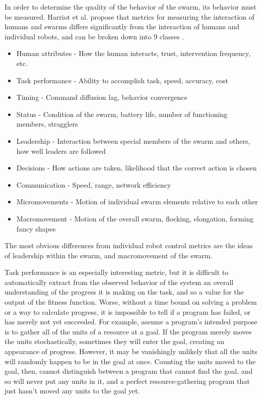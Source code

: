 \documentclass[]{article}
\begin{document}
In order to determine the quality of the behavior of the swarm, its behavior must be measured.
Harriot et al. propose that metrics for measuring the interaction of humans and swarms differs significantly from the interaction of humans and individual robots, and can be broken down into 9 classes \cite{harriott2014biologically}. 
\begin{itemize}
\item Human attributes - How the human interacts, trust, intervention frequency, etc. 
\item Task performance - Ability to accomplish task, speed, accuracy, cost
\item Timing - Command diffusion lag, behavior convergence
\item Status - Condition of the swarm, battery life, number of functioning members, stragglers
\item Leadership - Interaction between special members of the swarm and others, how well leaders are followed
\item Decisions - How actions are taken, likelihood that the correct action is chosen
\item Communication - Speed, range, network efficiency
\item Micromovements - Motion of individual swarm elements relative to each other
\item Macromovement - Motion of the overall swarm, flocking, elongation, forming fancy shapes 
\end{itemize}
The most obvious differences from individual robot control metrics are the ideas of leadership within the swarm, and macromovement of the swarm.

Task performance is an especially interesting metric, but it is difficult to automatically extract from the observed behavior of the system an overall understanding of the progress it is making on the task, and so a value for the output of the fitness function. 
Worse, without a time bound on solving a problem or a way to calculate progress, it is impossible to tell if a program has failed, or has merely not yet succeeded.
For example, assume a program's intended purpose is to gather all of the units of a resource at a goal. 
If the program merely moves the units stochastically, sometimes they will enter the goal, creating an appearance of progress. 
However, it may be vanishingly unlikely that all the units will randomly happen to be in the goal at once. 
Counting the units moved to the goal, then, cannot distinguish between a program that cannot find the goal, and so will never put any units in it, and a perfect resource-gathering program that just hasn't moved any units to the goal yet.
 
\end{document}

